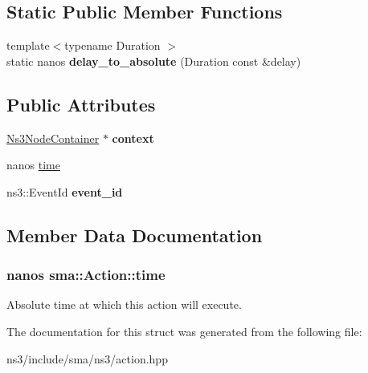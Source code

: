 \subsection*{Static Public Member Functions}
\begin{DoxyCompactItemize}
\item 
\hypertarget{structsma_1_1Action_a9fb0067a41679d83f6f60d16a4aa3fb6}{{\footnotesize template$<$typename Duration $>$ }\\static nanos {\bfseries delay\-\_\-to\-\_\-absolute} (Duration const \&delay)}\label{structsma_1_1Action_a9fb0067a41679d83f6f60d16a4aa3fb6}

\end{DoxyCompactItemize}
\subsection*{Public Attributes}
\begin{DoxyCompactItemize}
\item 
\hypertarget{structsma_1_1Action_a7af95774e1af5fa6618c60e108a6f9e4}{\hyperlink{classsma_1_1Ns3NodeContainer}{Ns3\-Node\-Container} $\ast$ {\bfseries context}}\label{structsma_1_1Action_a7af95774e1af5fa6618c60e108a6f9e4}

\item 
nanos \hyperlink{structsma_1_1Action_ae0e6be0e4548f1f27d4818e4d23ddbcf}{time}
\item 
\hypertarget{structsma_1_1Action_a3b6cf7ebcc195b0125f6da2ca6035233}{ns3\-::\-Event\-Id {\bfseries event\-\_\-id}}\label{structsma_1_1Action_a3b6cf7ebcc195b0125f6da2ca6035233}

\end{DoxyCompactItemize}


\subsection{Member Data Documentation}
\hypertarget{structsma_1_1Action_ae0e6be0e4548f1f27d4818e4d23ddbcf}{
\subsubsection[{time}]{\setlength{\rightskip}{0pt plus 5cm}nanos sma\-::\-Action\-::time}}\label{structsma_1_1Action_ae0e6be0e4548f1f27d4818e4d23ddbcf}
Absolute time at which this action will execute. 

The documentation for this struct was generated from the following file\-:\begin{DoxyCompactItemize}
\item 
ns3/include/sma/ns3/action.\-hpp\end{DoxyCompactItemize}
